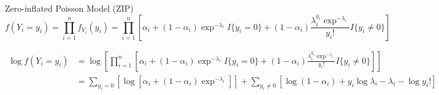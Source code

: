 \documentclass[aspectratio=169,xcolor=dvipsnames]{beamer}
\begin{document}
	
	
	
	
	\begin{frame}{Zero-inflated Poisson Model (ZIP)}
		\[
		f(Y_{i} = y_{i}) = \prod_{i = 1}^{n}f_{Y_{i}}(y_{i}) = \prod_{i = 1}^{n} \left[ \alpha_{i} + (1 - \alpha_{i})\exp^{-\lambda_{i}}I\{y_{i} = 0\} + (1 - \alpha_{i}) \frac{\lambda_{i}^{y_{i}}\exp^{-\lambda_{i}}}{y_{i}!}I\{y_{i} \neq 0\} \right]
		\]
		
		\[
		\begin{aligned}
			\log f(Y_{i} = y_{i}) &= \log \left[\prod_{i = 1}^{n} \left[\alpha_{i} + (1 - \alpha_{i})\exp^{-\lambda_{i}}I\{y_{i} = 0\} + (1 - \alpha_{i}) \frac{\lambda_{i}^{y_{i}}\exp^{-\lambda_{i}}}{y_{i}!}I\{y_{i} \neq 0\} \right] \right]\\
			&= \sum_{y_{i} = 0} \left[ \log \left[ \alpha_{i} + (1 - \alpha_{i}) \exp^{-\lambda_{i}} \right] \right]
			+ \sum_{y_{i} \neq 0} \left[ \log(1 - \alpha_{i}) +  y_{i} \log \lambda_{i} - \lambda_{i} - \log y_{i}! \right]
		\end{aligned}
		\]
		
	\end{frame}
	

\end{document}
